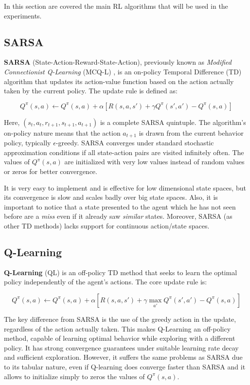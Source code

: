 In this section are covered the main RL algorithms that will be used in the experiments.

\subsection{SARSA}

\textbf{SARSA} (State-Action-Reward-State-Action), previously known as \textit{Modified Connectionist Q-Learning} (MCQ-L) \cite{rummery1994line}, is an on-policy Temporal Difference (TD) algorithm that updates its action-value function based on the action actually taken by the current policy. The update rule is defined as:

\[
  Q^\pi(s, a) \leftarrow Q^\pi(s, a) + \alpha \left[ R(s, a, s') + \gamma Q^\pi(s', a') - Q^\pi(s, a) \right]
\]

Here, $(s_t, a_t, r_{t+1}, s_{t+1}, a_{t+1})$ is a complete SARSA quintuple. The algorithm’s on-policy nature means that the action $a_{t+1}$ is drawn from the current behavior policy, typically $\epsilon$-greedy. SARSA converges under standard stochastic approximation conditions if all state-action pairs are visited infinitely often.
The values of $Q^\pi(s, a)$ are initialized with very low values instead of random values or zeros for better convergence.

It is very easy to implement and is effective for low dimensional state spaces, but its convergence is slow and scales badly over big state spaces.
Also, it is important to notice that a state presented to the agent which he has not seen before are a \textit{miss} even if it already saw \textit{similar} states.
Moreover, SARSA (as other TD methods) lacks support for continuous action/state spaces.

\subsection{Q-Learning}

\textbf{Q-Learning} (QL) \cite{watkins1992q} is an off-policy TD method that seeks to learn the optimal policy independently of the agent’s actions. The core update rule is:

\[
  Q^\pi(s, a) \leftarrow Q^\pi(s, a) + \alpha \left[ R(s, a, s') + \gamma \max_{a'} Q^\pi(s', a') - Q^\pi(s, a) \right]
\]

The key difference from SARSA is the use of the greedy action in the update, regardless of the action actually taken. This makes Q-Learning an off-policy method, capable of learning optimal behavior while exploring with a different policy. It has strong convergence guarantees under suitable learning rate decay and sufficient exploration.
However, it suffers the same problems as SARSA due to its tabular nature, even if Q-learning does converge faster than SARSA and it allows to initialize simply to zeros the values of $Q^\pi(s, a)$.


